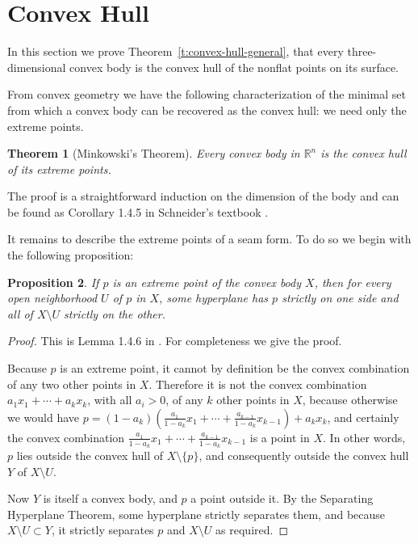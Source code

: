 \documentclass{article}
\newtheorem{theorem}{Theorem}
\newtheorem{proposition}[theorem]{Proposition}
\newcommand\R{\mathbb R}
\begin{document}
\section{Convex Hull}
\label{sec:convex-hull}

In this section we prove Theorem~\ref{t:convex-hull-general}, that
every three-dimensional convex body is the convex hull of the nonflat
points on its surface.

From convex geometry we have the following characterization of the
minimal set from which a convex body can be recovered as the convex
hull: we need only the extreme points.
\begin{theorem}[Minkowski's Theorem]\label{t:hull-of-extreme}
  Every convex body in $\R^n$ is the convex hull of its extreme points.
\end{theorem}
The proof is a straightforward induction on the dimension of the body
and can be found as Corollary 1.4.5 in Schneider's textbook
\cite{Schneider}.

It remains to describe the extreme points of a seam form.  To do so we
begin with the following proposition:
\begin{proposition}\label{p:extreme-separate}
  If $p$ is an extreme point of the convex body $X$, then for every
  open neighborhood $U$ of $p$ in $X$, some hyperplane has $p$
  strictly on one side and all of $X \setminus U$ strictly on the other.
\end{proposition}
\begin{proof}
  This is Lemma 1.4.6 in \cite{Schneider}.  For completeness we
  give the proof.

  Because $p$ is an extreme point, it cannot by definition be the
  convex combination of any two other points in $X$.  Therefore it is
  not the convex combination $a_1x_1 + \dotsb + a_kx_k$, with all $a_i
  > 0$, of any $k$ other points in $X$, because otherwise we would
  have $p = (1-a_k)(\frac{a_1}{1-a_k}x_1 + \dotsb +
  \frac{a_{k-1}}{1-a_k}x_{k-1}) + a_kx_k$, and certainly the convex
  combination $\frac{a_1}{1-a_k}x_1 + \dotsb +
  \frac{a_{k-1}}{1-a_k}x_{k-1}$ is a point in $X$.  In other words,
  $p$ lies outside the convex hull of $X \setminus \{p\}$, and
  consequently outside the convex hull $Y$ of $X \setminus U$.

  Now $Y$ is itself a convex body, and $p$ a point outside it.  By the
  Separating Hyperplane Theorem, some hyperplane strictly separates
  them, and because $X \setminus U \subset Y$, it strictly separates $p$
  and $X \setminus U$ as required.
\end{proof}
\end{document}
